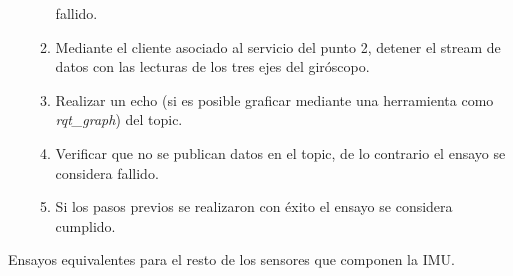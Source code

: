 \documentclass[
11pt, %
codirector, %
]{simple_charter}
\begin{document}
\begin{itemize}
\begin{enumerate}
		fallido.
		\item Mediante el cliente asociado al servicio del punto 2, detener el stream de datos con
		las lecturas de los tres ejes del giróscopo.
		\item Realizar un echo (si es posible graficar mediante una herramienta como
		\textit{rqt\_graph}) del topic.
		\item Verificar que no se publican datos en el topic, de lo contrario el ensayo se considera
		fallido.
		\item Si los pasos previos se realizaron con éxito el ensayo se considera cumplido.
	\end{enumerate}
\end{itemize}

Ensayos equivalentes para el resto de los sensores que componen la IMU.
\end{document}
